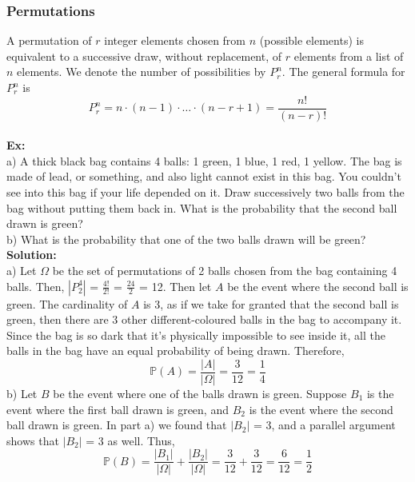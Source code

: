 \documentclass{article}
\newcommand{\bbP}{\mathbb{P}}
\newcommand{\Om}{\Omega}
\begin{document}
\subsubsection{Permutations}
A permutation of $r$ integer elements chosen from $n$ (possible elements) is equivalent to a successive draw, without replacement, of $r$ elements from a list of $n$ elements. We denote the number of possibilities by $P_{r}^{n}$. The general formula for $P_{r}^{n}$ is
\[P_{r}^{n} = n \cdot (n-1) \cdot \dots \cdot (n-r+1) = \frac{n!}{(n-r)!}\]\\
\textbf{Ex:} \\
a) A thick black bag contains 4 balls: 1 green, 1 blue, 1 red, 1 yellow. The bag is made of lead, or something, and also light cannot exist in this bag. You couldn't see into this bag if your life depended on it. Draw successively two balls from the bag without putting them back in. What is the probability that the second ball drawn is green?\\
b) What is the probability that one of the two balls drawn will be green?\\
\textbf{Solution:}\\
a) Let $\Om$ be the set of permutations of 2 balls chosen from the bag containing 4 balls. Then, $|P^{4}_{2}|$ = $\frac{4!}{2!}$ = $\frac{24}{2}$ = 12. Then let $A$ be the event where the second ball is green. The cardinality of $A$ is 3, as if we take for granted that the second ball is green, then there are 3 other different-coloured balls in the bag to accompany it. Since the bag is so dark that it's physically impossible to see inside it, all the balls in the bag have an equal probability of being drawn. Therefore,
\[ \bbP(A) = \frac{|A|}{|\Om|} = \frac{3}{12} = \frac{1}{4}\]
b) Let $B$ be the event where one of the balls drawn is green. Suppose $B_{1}$ is the event where the first ball drawn is green, and $B_{2}$ is the event where the second ball drawn is green. In part a) we found that $|B_{2}|$ = 3, and a parallel argument shows that $|B_{2}|$ = 3 as well. Thus,
 \[ \bbP(B) = \frac{|B_{1}|}{|\Om|} + \frac{|B_{2}|}{|\Om|} = \frac{3}{12} + \frac{3}{12} = \frac{6}{12} = \frac{1}{2}\]
\end{document}
